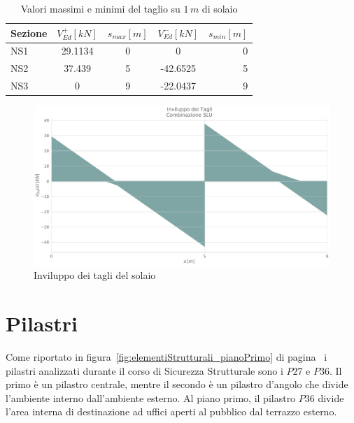\begin{table}[ht!]
	\centering
	\caption{Valori massimi e minimi del taglio su $1\,m$ di solaio}
	\label{tab:shear_solaio}
    \begin{tabular*}{\textwidth}{l @{\extracolsep{\fill}} cccr}
\toprule
Sezione &  $V_{Ed}^+ [kN]$ &  $s_{max} [m]$ &  $V_{Ed}^- [kN]$ &  $s_{min} [m] $\\
\midrule
NS1      &   29.1134 &        0 &         0 &        0 \\
NS2      &    37.439 &        5 &  -42.6525 &        5 \\
NS3      &  0 &        9 &  -22.0437 &        9 \\
\bottomrule
    \end{tabular*}
\end{table}

\begin{figure}
	\centering
	\includegraphics[width=\textwidth]{../../export/img/shearEnvelopeSolaio_slu}
	\caption{Inviluppo dei tagli del solaio}
	\label{fig:shearEnvelope_solaio}
\end{figure}

\cleardoublepage
\section{Pilastri}\label{sec:azioniPilastri}

Come riportato in figura~\ref{fig:elementiStrutturali_pianoPrimo} di pagina~\pageref{fig:elementiStrutturali_pianoPrimo} i pilastri analizzati durante il corso di Sicurezza Strutturale sono i $P27$ e $P36$. Il primo è un pilastro centrale, mentre il secondo è un pilastro d'angolo che divide l'ambiente interno dall'ambiente esterno. Al piano primo, il pilastro $P36$ divide l'area interna di destinazione ad uffici aperti al pubblico dal terrazzo esterno.

